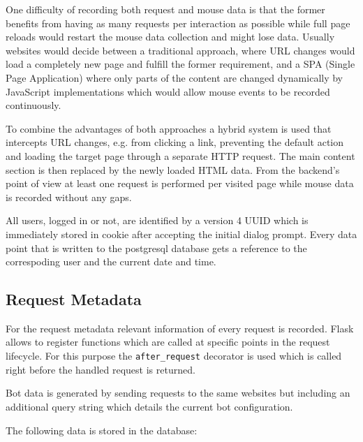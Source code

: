 \documentclass[
    fontsize=12pt,
    headings=small,
    parskip=half,           %
    bibliography=totoc,
    numbers=noenddot,       %
    open=any,               %
    final                   %
]{scrreprt}
\begin{document}
One difficulty of recording both request and mouse data is that the former benefits from having as many requests per interaction as possible while full page reloads would restart the mouse data collection and might lose data. Usually websites would decide between a traditional approach, where URL changes would load a completely new page and fulfill the former requirement, and a SPA (Single Page Application) where only parts of the content are changed dynamically by JavaScript implementations which would allow mouse events to be recorded continuously.

To combine the advantages of both approaches a hybrid system is used that intercepts URL changes, e.g. from clicking a link, preventing the default action and loading the target page through a separate HTTP request. The main content section is then replaced by the newly loaded HTML data. From the backend's point of view at least one request is performed per visited page while mouse data is recorded without any gaps.

All users, logged in or not, are identified by a version 4 UUID which is immediately stored in cookie after accepting the initial dialog prompt. Every data point that is written to the postgresql database gets a reference to the correspoding user and the current date and time.

\subsection{Request Metadata}

For the request metadata relevant information of every request is recorded. Flask allows to register functions which are called at specific points in the request lifecycle. For this purpose the \lstinline{after_request} decorator is used which is called right before the handled request is returned.

Bot data is generated by sending requests to the same websites but including an additional query string which details the current bot configuration.

The following data is stored in the database:
\end{document}
